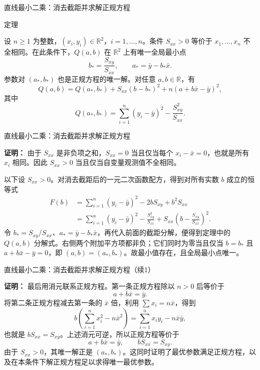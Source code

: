 \documentclass[aspectratio=169,10pt,fontset=fandol]{ctexbeamer}
\begin{document}
\begin{frame}[t,fragile]{直线最小二乘：消去截距并求解正规方程}
\footnotesize
\begin{block}{定理}
{\footnotesize
设 $n\geq1$ 为整数，$(x_i,y_i)\in\mathbb{R}^2$，$i=1,\ldots,n$。条件 $S_{xx}>0$ 等价于 $x_1,\ldots,x_n$ 不全相同。在此条件下，$Q(a,b)$ 在 $\mathbb{R}^2$ 上有唯一全局最小点
\[
b_* =\frac{S_{xy}}{S_{xx}},\qquad a_* =\bar{y}-b_*\bar{x}.
\]
参数对 $(a_*,b_*)$ 也是正规方程的唯一解。对任意 $a,b\in\mathbb{R}$，有
\[
Q(a,b)=Q(a_*,b_*)+S_{xx}(b-b_*)^2+n(a+b\bar{x}-\bar{y})^2,
\]
其中
\[
Q(a_*,b_*)=\sum_{i=1}^{n}(y_i-\bar{y})^2-\frac{S_{xy}^2}{S_{xx}}.
\]

}
\end{block}
\end{frame}
\begin{frame}[t,fragile]{直线最小二乘：消去截距并求解正规方程}
\footnotesize
{\footnotesize
\textbf{证明：}
由于 $S_{xx}$ 是非负项之和，$S_{xx}=0$ 当且仅当每个 $x_i-\bar{x}=0$，也就是所有 $x_i$ 相同。因此 $S_{xx}>0$ 当且仅当自变量观测值不全相同。

以下设 $S_{xx}>0$。对消去截距后的一元二次函数配方，得到对所有实数 $b$ 成立的恒等式
\[
\begin{aligned}
F(b)
&=\sum_{i=1}^{n}(y_i-\bar{y})^2-2bS_{xy}+b^2S_{xx}\\
&=\sum_{i=1}^{n}(y_i-\bar{y})^2-\frac{S_{xy}^2}{S_{xx}}
  +S_{xx}\left(b-\frac{S_{xy}}{S_{xx}}\right)^2.
\end{aligned}
\]
令 $b_*=S_{xy}/S_{xx}$、$a_*=\bar{y}-b_*\bar{x}$，再代入前面的截距分解，便得到定理中的 $Q(a,b)$ 分解式。右侧两个附加平方项都非负；它们同时为零当且仅当 $b=b_*$ 且 $a+b\bar{x}-\bar{y}=0$，即 $(a,b)=(a_*,b_*)$。故最小值存在，且全局最小点唯一。


}
\end{frame}
\begin{frame}[t,fragile]{直线最小二乘：消去截距并求解正规方程（续1）}
\footnotesize
{\footnotesize
\textbf{证明：}
最后用消元联系正规方程。第一条正规方程除以 $n>0$ 后等价于
\[
a+b\bar{x}=\bar{y}.
\]
将第二条正规方程减去第一条的 $\bar{x}$ 倍，利用 $\sum x_i=n\bar{x}$，得到
\[
b\left(\sum_{i=1}^{n}x_i^2-n\bar{x}^2\right)
=\sum_{i=1}^{n}x_i y_i-n\bar{x}\bar{y},
\]
也就是 $bS_{xx}=S_{xy}$。上述消元可逆，所以正规方程等价于
\[
a+b\bar{x}=\bar{y},\qquad bS_{xx}=S_{xy}.
\]
由于 $S_{xx}>0$，其唯一解正是 $(a_*,b_*)$。这同时证明了最优参数满足正规方程，以及在本条件下解正规方程足以求得唯一最优参数。

}
\end{frame}
\end{document}
